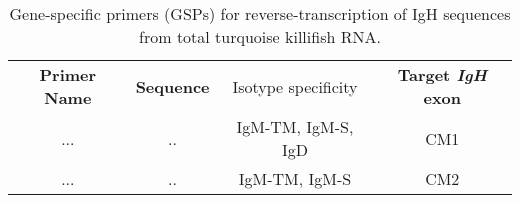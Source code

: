 \begin{table}
\begin{threeparttable}
\caption{Gene-specific primers (GSPs) for reverse-transcription of IgH sequences from total turquoise killifish RNA.}
\begin{tabular}{cccc} %
\textbf{Primer Name} & \textbf{Sequence} & Isotype specificity & \textbf{Target \textit{IgH} exon}\\
... & .. & IgM-TM, IgM-S, IgD & CM1\\
... & .. & IgM-TM, IgM-S & CM2\\
\end{tabular}
\end{threeparttable}
\label{tab:lp_gsps}
\end{table}